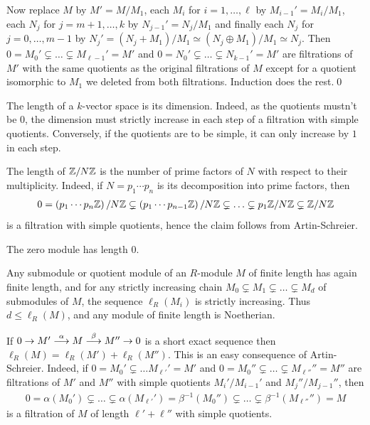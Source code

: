 \documentclass[a4paper,parskip=half,numbers=enddot, DIV=12]{scrreprt}
\begin{document}
\begin{rem}
\begin{alphanumerate}
        Now replace $M$ by $M'=M/M_1$, each $M_i$ for $i=1,\ldots,\ell$ by $M_{i-1}'=M_i/M_1$, each $N_j$ for $j= m+1,\ldots,k$ by $N_{j-1}'=N_j/M_1$ and finally each $N_j$ for $j=0,\ldots, m-1$ by $N_j'=(N_j+M_1)/M_1\simeq (N_j\oplus M_1)/M_1\simeq N_j$. Then $0=M_0'\subsetneq\ldots \subsetneq M_{\ell-1}'=M'$ and $0=N_0'\subsetneq \ldots\subsetneq N_{k-1}'=M'$ are filtrations of $M'$ with the same quotients as the original filtrations of $M$ except for a quotient isomorphic to $M_1$ we deleted from both filtrations. Induction does the rest.\qed
    \item 
        The length of a $k$-vector space is its dimension. Indeed, as the quotients mustn't be $0$, the dimension must strictly increase in each step of a filtration with simple quotients. Conversely, if the quotients are to be simple, it can only increase by $1$ in each step.
    \item
        The length of $\mathbb{Z}/N\mathbb{Z}$ is the number of prime factors of $N$ with respect to their multiplicity. Indeed, if $N=p_1\cdots p_n$ is its decomposition into prime factors, then
        \begin{align*}
        	0= \left(p_1\cdots p_n\mathbb{Z}\right)/N\mathbb{Z}\subsetneq \left(p_1\cdots p_{n-1}\mathbb{Z}\right)/N\mathbb{Z}\subsetneq\ldots\subsetneq p_1\mathbb{Z}/N\mathbb{Z}\subsetneq\mathbb{Z}/N\mathbb{Z}
        \end{align*}
        is a filtration with simple quotients, hence the claim follows from Artin-Schreier.
    \item 
        The zero module has length 0.
    \item 
        Any submodule or quotient module of an $R$-module $M$ of finite length has again finite length, and for any strictly increasing chain $M_0\subsetneq M_1\subsetneq\ldots\subsetneq M_d$ of submodules of $M$, the sequence $\ell_R(M_i)$ is strictly increasing. Thus $d\leq \ell_R(M)$, and any module of finite length is Noetherian.
    \item 
        If $0\morphism M' \morphism[\alpha] M\morphism[\beta] M'' \morphism 0$ is a short exact sequence then $\ell_R(M) = \ell_R(M') +\ell_R(M'')$. This is an easy consequence of Artin-Schreier. Indeed, if $0=M_0'\subsetneq\ldots M_{\ell'}'=M'$ and $0=M_0''\subsetneq\ldots\subsetneq M_{\ell''}''=M''$ are filtrations of $M'$ and $M''$ with simple quotients $M_i'/M_{i-1}'$ and $M_j''/M_{j-1}''$, then 
        \begin{align*}
        	0=\alpha(M_0')\subsetneq\ldots\subsetneq \alpha(M_{\ell'}')=\beta^{-1}(M_0'')\subsetneq\ldots\subsetneq \beta^{-1}(M_{\ell''}'')=M
        \end{align*}
        is a filtration of $M$ of length $\ell'+\ell''$ with simple quotients.
        

\end{alphanumerate}
\end{rem}
\end{document}
